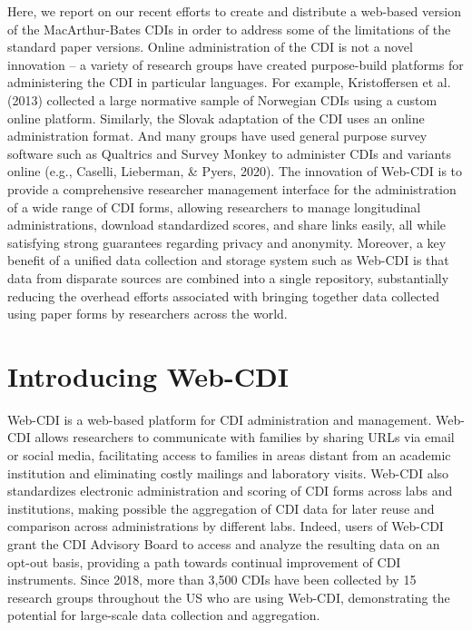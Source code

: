 \documentclass[
  english,
  ,man,floatsintext]{apa6}
\begin{document}
Here, we report on our recent efforts to create and distribute a web-based version of the MacArthur-Bates CDIs in order to address some of the limitations of the standard paper versions. Online administration of the CDI is not a novel innovation -- a variety of research groups have created purpose-build platforms for administering the CDI in particular languages. For example, Kristoffersen et al. (2013) collected a large normative sample of Norwegian CDIs using a custom online platform. Similarly, the Slovak adaptation of the CDI uses an online administration format. And many groups have used general purpose survey software such as Qualtrics and Survey Monkey to administer CDIs and variants online (e.g., Caselli, Lieberman, \& Pyers, 2020). The innovation of Web-CDI is to provide a comprehensive researcher management interface for the administration of a wide range of CDI forms, allowing researchers to manage longitudinal administrations, download standardized scores, and share links easily, all while satisfying strong guarantees regarding privacy and anonymity. Moreover, a key benefit of a unified data collection and storage system such as Web-CDI is that data from disparate sources are combined into a single repository, substantially reducing the overhead efforts associated with bringing together data collected using paper forms by researchers across the world.

\hypertarget{introducing-web-cdi}{%
\section{Introducing Web-CDI}\label{introducing-web-cdi}}

Web-CDI is a web-based platform for CDI administration and management. Web-CDI allows researchers to communicate with families by sharing URLs via email or social media, facilitating access to families in areas distant from an academic institution and eliminating costly mailings and laboratory visits. Web-CDI also standardizes electronic administration and scoring of CDI forms across labs and institutions, making possible the aggregation of CDI data for later reuse and comparison across administrations by different labs. Indeed, users of Web-CDI grant the CDI Advisory Board to access and analyze the resulting data on an opt-out basis, providing a path towards continual improvement of CDI instruments. Since 2018, more than 3,500 CDIs have been collected by 15 research groups throughout the US who are using Web-CDI, demonstrating the potential for large-scale data collection and aggregation.
\end{document}
